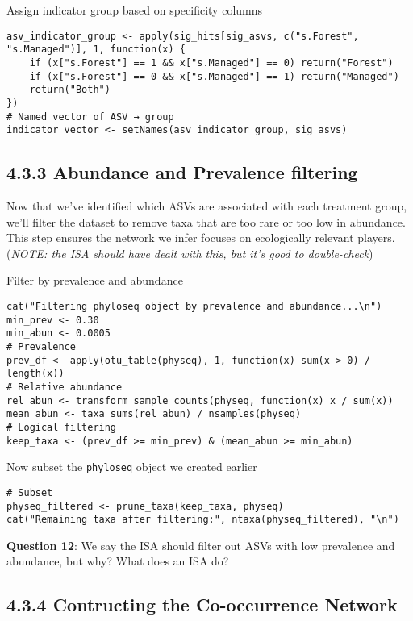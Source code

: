 \documentclass[
]{book}
\begin{document}
Assign indicator group based on specificity columns

\begin{verbatim}
asv_indicator_group <- apply(sig_hits[sig_asvs, c("s.Forest", "s.Managed")], 1, function(x) {
    if (x["s.Forest"] == 1 && x["s.Managed"] == 0) return("Forest")
    if (x["s.Forest"] == 0 && x["s.Managed"] == 1) return("Managed")
    return("Both")
})
# Named vector of ASV → group
indicator_vector <- setNames(asv_indicator_group, sig_asvs)
\end{verbatim}

\subsection{4.3.3 Abundance and Prevalence filtering}\label{abundance-and-prevalence-filtering}

Now that we've identified which ASVs are associated with each treatment group, we'll filter the dataset to remove taxa that are too rare or too low in abundance. This step ensures the network we infer focuses on ecologically relevant players. (\emph{NOTE: the ISA should have dealt with this, but it's good to double-check})

Filter by prevalence and abundance

\begin{verbatim}
cat("Filtering phyloseq object by prevalence and abundance...\n")
min_prev <- 0.30
min_abun <- 0.0005
# Prevalence
prev_df <- apply(otu_table(physeq), 1, function(x) sum(x > 0) / length(x))
# Relative abundance
rel_abun <- transform_sample_counts(physeq, function(x) x / sum(x))
mean_abun <- taxa_sums(rel_abun) / nsamples(physeq)
# Logical filtering
keep_taxa <- (prev_df >= min_prev) & (mean_abun >= min_abun)
\end{verbatim}

Now subset the \texttt{phyloseq} object we created earlier

\begin{verbatim}
# Subset
physeq_filtered <- prune_taxa(keep_taxa, physeq)
cat("Remaining taxa after filtering:", ntaxa(physeq_filtered), "\n")
\end{verbatim}

\textbf{Question 12}: We say the ISA should filter out ASVs with low prevalence and abundance, but why? What does an ISA do?

\subsection{4.3.4 Contructing the Co-occurrence Network}\label{contructing-the-co-occurrence-network}
\end{document}
